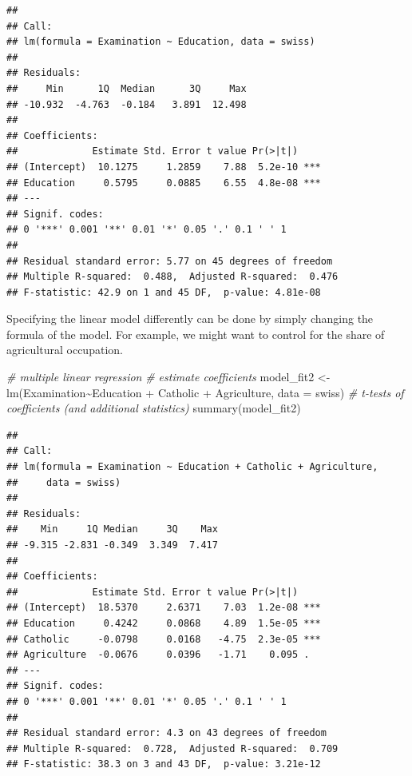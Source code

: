 \documentclass[
  12pt,
]{style/krantz}
\newenvironment{Shaded}{\begin{snugshade}}{\end{snugshade}}
\newcommand{\AttributeTok}[1]{\textcolor[rgb]{0.77,0.63,0.00}{#1}}
\newcommand{\CommentTok}[1]{\textcolor[rgb]{0.56,0.35,0.01}{\textit{#1}}}
\newcommand{\FunctionTok}[1]{\textcolor[rgb]{0.00,0.00,0.00}{#1}}
\newcommand{\NormalTok}[1]{#1}
\newcommand{\OtherTok}[1]{\textcolor[rgb]{0.56,0.35,0.01}{#1}}
\newcommand{\SpecialCharTok}[1]{\textcolor[rgb]{0.00,0.00,0.00}{#1}}
\begin{document}
\begin{verbatim}
## 
## Call:
## lm(formula = Examination ~ Education, data = swiss)
## 
## Residuals:
##     Min      1Q  Median      3Q     Max 
## -10.932  -4.763  -0.184   3.891  12.498 
## 
## Coefficients:
##             Estimate Std. Error t value Pr(>|t|)    
## (Intercept)  10.1275     1.2859    7.88  5.2e-10 ***
## Education     0.5795     0.0885    6.55  4.8e-08 ***
## ---
## Signif. codes:  
## 0 '***' 0.001 '**' 0.01 '*' 0.05 '.' 0.1 ' ' 1
## 
## Residual standard error: 5.77 on 45 degrees of freedom
## Multiple R-squared:  0.488,  Adjusted R-squared:  0.476 
## F-statistic: 42.9 on 1 and 45 DF,  p-value: 4.81e-08
\end{verbatim}

Specifying the linear model differently can be done by simply changing the formula of the model. For example, we might want to control for the share of agricultural occupation.

\begin{Shaded}
\begin{Highlighting}[]
\CommentTok{\# multiple linear regression}
\CommentTok{\# estimate coefficients}
\NormalTok{model\_fit2 }\OtherTok{\textless{}{-}} \FunctionTok{lm}\NormalTok{(Examination}\SpecialCharTok{\textasciitilde{}}\NormalTok{Education }\SpecialCharTok{+}\NormalTok{ Catholic }\SpecialCharTok{+}\NormalTok{ Agriculture, }\AttributeTok{data =}\NormalTok{ swiss)}
\CommentTok{\# t{-}tests of coefficients (and additional statistics)}
\FunctionTok{summary}\NormalTok{(model\_fit2)}
\end{Highlighting}
\end{Shaded}

\begin{verbatim}
## 
## Call:
## lm(formula = Examination ~ Education + Catholic + Agriculture, 
##     data = swiss)
## 
## Residuals:
##    Min     1Q Median     3Q    Max 
## -9.315 -2.831 -0.349  3.349  7.417 
## 
## Coefficients:
##             Estimate Std. Error t value Pr(>|t|)    
## (Intercept)  18.5370     2.6371    7.03  1.2e-08 ***
## Education     0.4242     0.0868    4.89  1.5e-05 ***
## Catholic     -0.0798     0.0168   -4.75  2.3e-05 ***
## Agriculture  -0.0676     0.0396   -1.71    0.095 .  
## ---
## Signif. codes:  
## 0 '***' 0.001 '**' 0.01 '*' 0.05 '.' 0.1 ' ' 1
## 
## Residual standard error: 4.3 on 43 degrees of freedom
## Multiple R-squared:  0.728,  Adjusted R-squared:  0.709 
## F-statistic: 38.3 on 3 and 43 DF,  p-value: 3.21e-12
\end{verbatim}
\end{document}
